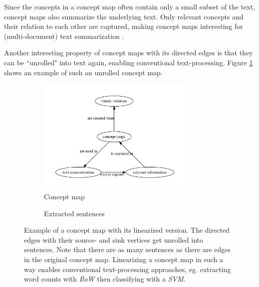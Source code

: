 Since the concepts in a concept map often contain only a small subset of the text, concept maps also summarize the underlying text.
Only relevant concepts and their relation to each other are captured, making concept maps interesting for (multi-document) text summarization \cite{Falke2017b}.

Another interesting property of concept maps with its directed edges is that they can be ``unrolled" into text again, enabling conventional text-processing.
Figure \ref{fig:concept_map_linearization} shows an example of such an unrolled concept map.

\begin{figure}[htb!]
	\centering
	\begin{subfigure}[b]{.48\linewidth}
		\centering
		\includegraphics[height=2.2in]{assets/figures/graph_example_linearization.pdf}
		\caption{Concept map}
	\end{subfigure}
	\begin{subfigure}[b]{.48\linewidth}
		\centering
		\noindent{}
		\vspace{0.8in}
		\caption{Extracted sentences}
	\end{subfigure}%
	\caption[Example: Linearized Concept Map]{Example of a concept map with its linearized version.
		The directed edges with their source- and sink vertices get unrolled into sentences.
		Note that there are as many sentences as there are edges in the original concept map.
		Linearizing a concept map in such a way enables conventional text-processing approaches, eg. extracting word counts with \textit{BoW} then classifying with a \textit{SVM}.}
	\label{fig:concept_map_linearization}
\end{figure}


